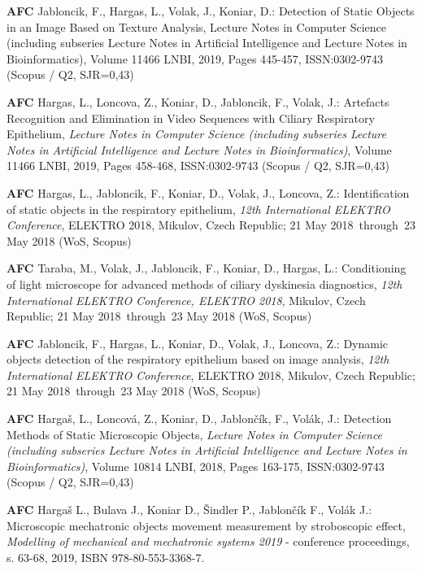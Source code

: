 \noindent \textbf{AFC} Jabloncik, F., Hargas, L., Volak, J., Koniar, D.: Detection of Static Objects in an Image Based on Texture Analysis, Lecture Notes in Computer Science (including subseries Lecture Notes in Artificial Intelligence and Lecture Notes in Bioinformatics), Volume 11466 LNBI, 2019, Pages 445-457, ISSN:0302-9743 (Scopus / Q2, SJR=0,43) \newline

\noindent \textbf{AFC} Hargas, L., Loncova, Z., Koniar, D., Jabloncik, F., Volak, J.: Artefacts Recognition and Elimination in Video Sequences with Ciliary Respiratory Epithelium, \textit{Lecture Notes in Computer Science (including subseries Lecture Notes in Artificial Intelligence and Lecture Notes in Bioinformatics)}, Volume 11466 LNBI, 2019, Pages 458-468, ISSN:0302-9743 (Scopus / Q2, SJR=0,43) \newline

\noindent \textbf{AFC} Hargas, L., Jabloncik, F., Koniar, D., Volak, J., Loncova, Z.: Identification of static objects in the respiratory epithelium, \textit{12th International ELEKTRO Conference}, ELEKTRO 2018, Mikulov, Czech Republic; 21 May 2018 through 23 May 2018 (WoS, Scopus) \newline

\noindent \textbf{AFC} Taraba, M., Volak, J., Jabloncik, F., Koniar, D., Hargas, L.: Conditioning of light microscope for advanced methods of ciliary dyskinesia diagnostics, \textit{12th International ELEKTRO Conference, ELEKTRO 2018}, Mikulov, Czech Republic; 21 May 2018 through 23 May 2018 (WoS, Scopus) \newline

\noindent \textbf{AFC} Jabloncik, F., Hargas, L., Koniar, D., Volak, J., Loncova, Z.: Dynamic objects detection of the respiratory epithelium based on image analysis, \textit{12th International ELEKTRO Conference}, ELEKTRO 2018, Mikulov, Czech Republic; 21 May 2018 through 23 May 2018 (WoS, Scopus) \newline

\noindent \textbf{AFC} Hargaš, L., Loncová, Z., Koniar, D., Jablončík, F., Volák, J.: Detection Methods of Static Microscopic Objects, \textit{Lecture Notes in Computer Science (including subseries Lecture Notes in Artificial Intelligence and Lecture Notes in Bioinformatics)}, Volume 10814 LNBI, 2018, Pages 163-175, ISSN:0302-9743 (Scopus / Q2, SJR=0,43) \newline

\noindent \textbf{AFC} Hargaš L., Bulava J., Koniar D., Šindler P., Jablončík F., Volák J.: Microscopic mechatronic objects movement measurement by stroboscopic effect, \textit{Modelling of mechanical and mechatronic systems 2019} - conference proceedings, s. 63-68, 2019, ISBN 978-80-553-3368-7. \newline

